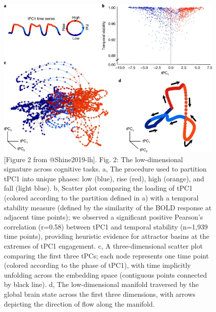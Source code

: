 \documentclass[
  letterpaper,
  DIV=11,
  numbers=noendperiod]{scrartcl}
\begin{document}
\begin{figure}[H]

{\centering \includegraphics{action_files/mediabag/41593_2018_312_Fig2_.webp}

}

\caption{{[}Figure 2 from @Shine2019-lh{]}. Fig. 2: The low-dimensional
signature across cognitive tasks. a, The procedure used to partition
tPC1 into unique phases: low (blue), rise (red), high (orange), and fall
(light blue). b, Scatter plot comparing the loading of tPC1 (colored
according to the partition defined in a) with a temporal stability
measure (defined by the similarity of the BOLD response at adjacent time
points); we observed a significant positive Pearson's correlation
(r=0.58) between \textbar tPC1\textbar{} and temporal stability (n=1,939
time points), providing heuristic evidence for attractor basins at the
extremes of tPC1 engagement. c, A three-dimensional scatter plot
comparing the first three tPCs; each node represents one time point
(colored according to the phase of tPC1), with time implicitly unfolding
across the embedding space (contiguous points connected by black line).
d, The low-dimensional manifold traversed by the global brain state
across the first three dimensions, with arrows depicting the direction
of flow along the manifold.}

\end{figure}%
\end{document}
